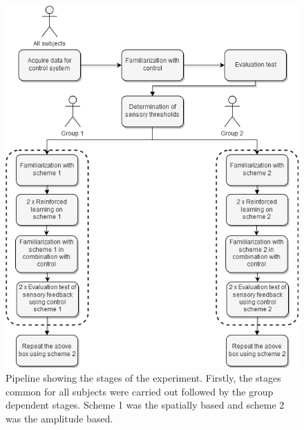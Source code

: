 \begin{figure}[H]                 
	\includegraphics[width=.65\textwidth]{figures/std_design}
	\caption{Pipeline showing the stages of the experiment. Firstly, the stages common for all subjects were carried out followed by the group dependent stages. Scheme 1 was the spatially based and scheme 2 was the amplitude based.}
	\label{fig:std} 
\end{figure}